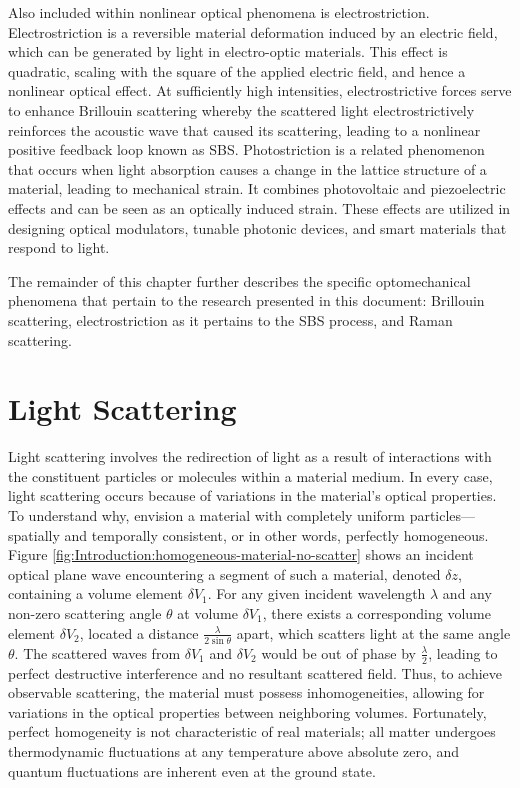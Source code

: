 Also included within nonlinear optical phenomena is electrostriction. Electrostriction is a reversible material deformation induced by an electric field, which can be generated by light in electro-optic materials. This effect is quadratic, scaling with the square of the applied electric field, and hence a nonlinear optical effect. At sufficiently high intensities, electrostrictive forces serve to enhance Brillouin scattering whereby the scattered light electrostrictively reinforces the acoustic wave that caused its scattering, leading to a nonlinear positive feedback loop known as \ac{SBS}. Photostriction is a related phenomenon that occurs when light absorption causes a change in the lattice structure of a material, leading to mechanical strain. It combines photovoltaic and piezoelectric effects and can be seen as an optically induced strain. These effects are utilized in designing optical modulators\cite{}, tunable photonic devices\cite{}, and smart materials that respond to light\cite{}.

The remainder of this chapter further describes the specific optomechanical phenomena that pertain to the research presented in this document: Brillouin scattering, electrostriction as it pertains to the \ac{SBS} process, and Raman scattering.


\section{Light Scattering}
\label{Introduction:sec:LightScattering}
Light scattering involves the redirection of light as a result of interactions with the constituent particles or molecules within a material medium. In every case, light scattering occurs because of variations in the material's optical properties. To understand why, envision a material with completely uniform particles---spatially and temporally consistent, or in other words, perfectly homogeneous. Figure \ref{fig:Introduction:homogeneous-material-no-scatter} shows an incident optical plane wave encountering a segment of such a material, denoted $\delta z$, containing a volume element $\delta V_{1}$. For any given incident wavelength $\lambda$ and any non-zero scattering angle $\theta$ at volume $\delta V_{1}$, there exists a corresponding volume element $\delta V_{2}$, located a distance $\frac{\lambda}{2\sin\theta}$ apart, which scatters light at the same angle $\theta$. The scattered waves from $\delta V_{1}$ and $\delta V_{2}$ would be out of phase by $\frac{\lambda}{2}$, leading to perfect destructive interference and no resultant scattered field. Thus, to achieve observable scattering, the material must possess inhomogeneities, allowing for variations in the optical properties between neighboring volumes. Fortunately, perfect homogeneity is not characteristic of real materials; all matter undergoes thermodynamic fluctuations at any temperature above absolute zero, and quantum fluctuations are inherent even at the ground state.

